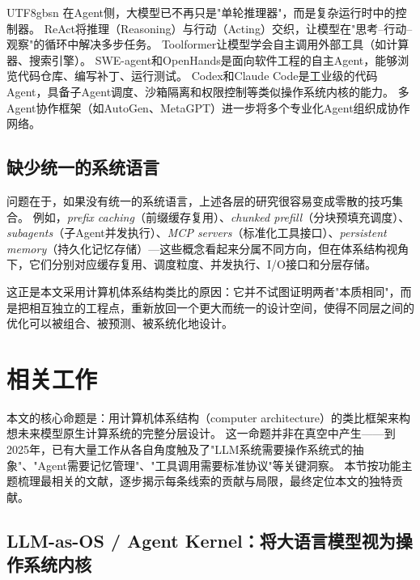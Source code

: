 \documentclass[11pt,a4paper]{article}
\begin{document}
\begin{CJK*}{UTF8}{gbsn}
在Agent侧，大模型已不再只是"单轮推理器"，而是复杂运行时中的控制器。
ReAct\cite{yao2023react}将推理（Reasoning）与行动（Acting）交织，让模型在"思考--行动--观察"的循环中解决多步任务。
Toolformer\cite{schick2023toolformer}让模型学会自主调用外部工具（如计算器、搜索引擎）。
SWE-agent\cite{sweagent2024}和OpenHands\cite{openhands_paper_2025}是面向软件工程的自主Agent，能够浏览代码仓库、编写补丁、运行测试。
Codex\cite{openai_codex_overview_2026}和Claude Code\cite{anthropic_claudecode_overview_2026}是工业级的代码Agent，具备子Agent调度\cite{openai_codex_subagents_2026,anthropic_claudecode_subagents_2026}、沙箱隔离\cite{openai_codex_sandbox_2026,anthropic_claudecode_sandbox_2026}和权限控制\cite{openai_codex_approvals_2026,anthropic_claudecode_security_2026}等类似操作系统内核的能力。
多Agent协作框架（如AutoGen\cite{wu2023autogen}、MetaGPT\cite{metagpt2023}）进一步将多个专业化Agent组织成协作网络。

\subsection{缺少统一的系统语言}

问题在于，如果没有统一的系统语言，上述各层的研究很容易变成零散的技巧集合。
例如，\emph{prefix caching}（前缀缓存复用）、\emph{chunked prefill}（分块预填充调度）、\emph{subagents}（子Agent并发执行）、\emph{MCP servers}（标准化工具接口）、\emph{persistent memory}（持久化记忆存储）---这些概念看起来分属不同方向，但在体系结构视角下，它们分别对应缓存复用、调度粒度、并发执行、I/O接口和分层存储。

这正是本文采用计算机体系结构类比的原因：它并不试图证明两者"本质相同"，而是把相互独立的工程点，重新放回一个更大而统一的设计空间，使得不同层之间的优化可以被组合、被预测、被系统化地设计。
\section{相关工作}
\label{sec:related}

本文的核心命题是：用计算机体系结构（computer architecture）的类比框架来构想未来模型原生计算系统的完整分层设计。
这一命题并非在真空中产生——到2025年，已有大量工作从各自角度触及了"LLM系统需要操作系统式的抽象"、"Agent需要记忆管理"、"工具调用需要标准协议"等关键洞察。
本节按功能主题梳理最相关的文献，逐步揭示每条线索的贡献与局限，最终定位本文的独特贡献。

\subsection{LLM-as-OS / Agent Kernel：将大语言模型视为操作系统内核}
\label{sec:related-llmos}


\end{CJK*}
\end{document}
